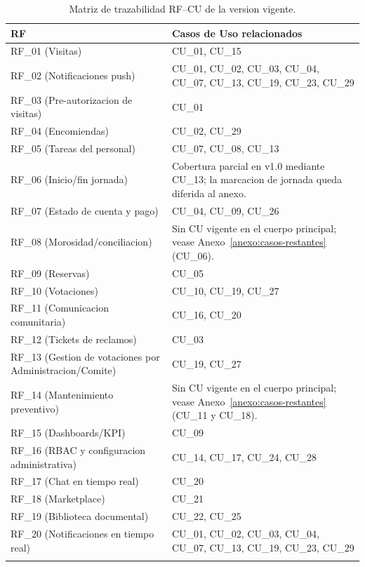 \begin{longtable}{|m{3cm}|m{12.5cm}|}
\hline
\textbf{RF} & \textbf{Casos de Uso relacionados} \\\hline
RF\_01 (Visitas) & CU\_01, CU\_15 \\\hline
RF\_02 (Notificaciones push) & CU\_01, CU\_02, CU\_03, CU\_04, CU\_07, CU\_13, CU\_19, CU\_23, CU\_29 \\\hline
RF\_03 (Pre-autorizacion de visitas) & CU\_01 \\\hline
RF\_04 (Encomiendas) & CU\_02, CU\_29 \\\hline
RF\_05 (Tareas del personal) & CU\_07, CU\_08, CU\_13 \\\hline
RF\_06 (Inicio/fin jornada) & Cobertura parcial en v1.0 mediante CU\_13; la marcacion de jornada queda diferida al anexo. \\\hline
RF\_07 (Estado de cuenta y pago) & CU\_04, CU\_09, CU\_26 \\\hline
RF\_08 (Morosidad/conciliacion) & Sin CU vigente en el cuerpo principal; vease Anexo~\ref{anexo:casos-restantes} (CU\_06). \\\hline
RF\_09 (Reservas) & CU\_05 \\\hline
RF\_10 (Votaciones) & CU\_10, CU\_19, CU\_27 \\\hline
RF\_11 (Comunicacion comunitaria) & CU\_16, CU\_20 \\\hline
RF\_12 (Tickets de reclamos) & CU\_03 \\\hline
RF\_13 (Gestion de votaciones por Administracion/Comite) & CU\_19, CU\_27 \\\hline
RF\_14 (Mantenimiento preventivo) & Sin CU vigente en el cuerpo principal; vease Anexo~\ref{anexo:casos-restantes} (CU\_11 y CU\_18). \\\hline
RF\_15 (Dashboards/KPI) & CU\_09 \\\hline
RF\_16 (RBAC y configuracion administrativa) & CU\_14, CU\_17, CU\_24, CU\_28 \\\hline
RF\_17 (Chat en tiempo real) & CU\_20 \\\hline
RF\_18 (Marketplace) & CU\_21 \\\hline
RF\_19 (Biblioteca documental) & CU\_22, CU\_25 \\\hline
RF\_20 (Notificaciones en tiempo real) & CU\_01, CU\_02, CU\_03, CU\_04, CU\_07, CU\_13, CU\_19, CU\_23, CU\_29 \\\hline
\caption{Matriz de trazabilidad RF--CU de la version vigente.}
\label{tab:traza-compacta}
\end{longtable}

